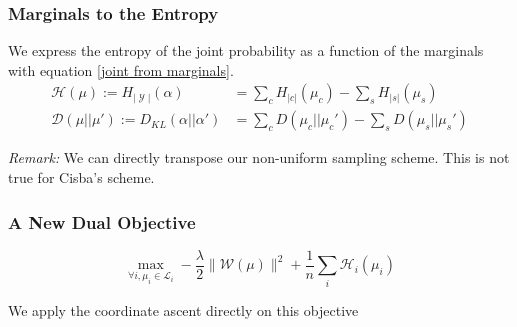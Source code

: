\documentclass{beamer}
\DeclareMathOperator{\1}{\mathbb{1}}
\DeclareMathOperator{\Y}{\mathcal{Y}}
\begin{document}
\begin{frame}
	\frametitle{Marginals to the Entropy}
	
	We express the entropy of the joint probability as a function of the marginals with equation \ref{joint from marginals}.
	\begin{align*}
	\mathcal H (\mu) := H_{|\Y|} (\alpha) & = \sum_c H_{|c|}(\mu_c) - \sum_s H_{|s|}(\mu_s) \\
	\mathcal D (\mu||\mu') := D_{KL}(\alpha||\alpha') & = \sum_c D(\mu_c||\mu_c') - \sum_s D(\mu_s||\mu_s')
	\end{align*}
	
	\textit{Remark:} We can directly transpose our non-uniform sampling scheme.
	This is not true for Cisba's scheme.

\end{frame}
\begin{frame}
	\frametitle{A New Dual Objective}
	
	\begin{equation}
	\max_{\forall i, \mu_i \in \mathcal L_i} - \frac{\lambda}{2} \| \mathcal W(\mu)\|^2 + \frac{1}{n} \sum_i \mathcal H _ i(\mu_i)
	\end{equation}
	
	\begin{center}
		We apply the coordinate ascent directly on this objective
	\end{center}

\end{frame}
\end{document}
